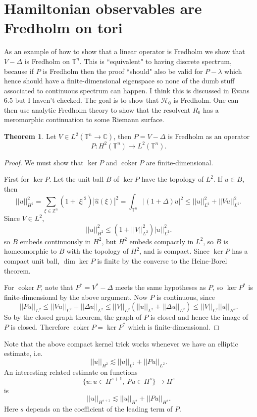 \documentclass[12pt]{report}
\newcommand{\ZZ}{\mathbb{Z}}
\newcommand{\CC}{\mathbb{C}}
\newcommand{\Torus}{\mathbb{T}}
\DeclareMathOperator{\coker}{coker}
\theoremstyle{definition}
\newtheorem{theorem}{Theorem}[chapter]
\begin{document}
\section{Hamiltonian observables are Fredholm on tori}
As an example of how to show that a linear operator is Fredholm we show that $V - \Delta$ is Fredholm on $\Torus^n$.
This is ``equivalent" to having discrete spectrum, because if $P$ is Fredholm then the proof ``should" also be valid for $P - \lambda$ which hence should have a finite-dimensional eigenspace so none of the dumb stuff associated to continuous spectrum can happen. I think this is discussed in Evans 6.5 but I haven't checked.
The goal is to show that $\mathcal H_0$ is Fredholm. One can then use analytic Fredholm theory to show that the resolvent $R_0$ has a meromorphic continuation to some Riemann surface.

\begin{theorem}
Let $V \in L^2(\Torus^n \to \CC)$, then $P = V - \Delta$ is Fredholm as an operator
$$P: H^2(\Torus^n) \to L^2(\Torus^n).$$
\end{theorem}
\begin{proof}
We must show that $\ker P$ and $\coker P$ are finite-dimensional.

First for $\ker P$. Let the unit ball $B$ of $\ker P$ have the topology of $L^2$. If $u \in B$, then
$$||u||_{H^2}^2 = \sum_{\xi \in \ZZ^n} (1 + |\xi|^2)|\hat u(\xi)|^2 = \int_{\Torus^n} |(1 + \Delta)u|^2 \leq ||u||_{L^2}^2 + ||Vu||_{L^2}^2.$$
Since $V \in L^2$,
$$||u||_{H^2}^2 \leq (1 + ||V||_{L^2}^2)|u||_{L^2}^2.$$
so $B$ embeds continuously in $H^2$, but $H^2$ embeds compactly in $L^2$, so $B$ is homeomorphic to $B$ with the topology of $H^2$, and is compact.
Since $\ker P$ has a compact unit ball, $\dim \ker P$ is finite by the converse to the Heine-Borel theorem.

For $\coker P$, note that $P^* = V^* - \Delta$ meets the same hypotheses as $P$, so $\ker P^*$ is finite-dimensional by the above argument.
Now $P$ is continuous, since
$$||Pu||_{L^2} \leq ||Vu||_{L^2} + ||\Delta u||_{L^2} \leq ||V||_{L^2}(||u||_{L^2} + ||\Delta u||_{L^2}) \leq ||V||_{L^2} ||u||_{H^2}.$$
So by the closed graph theorem, the graph of $P$ is closed and hence the image of $P$ is closed.
Therefore $\coker P = \ker P^*$ which is finite-dimensional.
\end{proof}

Note that the above compact kernel trick works whenever we have an elliptic estimate, i.e.
$$||u||_{H^2} \lesssim ||u||_{L^2} + ||Pu||_{L^2}.$$
An interesting related estimate on functions
$$\{u:u\in H^{s+1},~Pu \in H^s\} \to H^s$$
is
$$||u||_{H^{s+1}} \lesssim ||u||_{H^s} + ||Pu||_{H^s}.$$
Here $s$ depends on the coefficient of the leading term of $P$.
\end{document}
